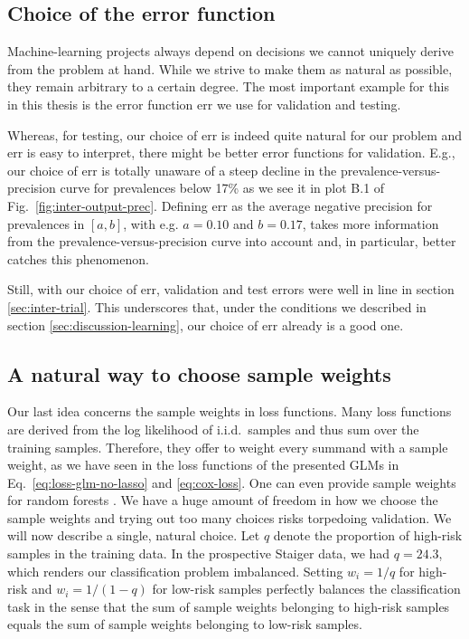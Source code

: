\subsection{Choice of the error function}

Machine-learning projects always depend on decisions we cannot uniquely derive from the problem at hand. 
While we strive to make them as natural as possible, they remain arbitrary to a certain degree. 
The most important example for this in this thesis is the error function $\text{err}$ we use for 
validation and testing.

Whereas, for testing, our choice of $\text{err}$ is indeed quite natural for our problem and 
$\text{err}$ is easy to interpret, there might be better error functions for validation. E.g., our 
choice of $\text{err}$ is totally unaware of a steep decline in the prevalence-versus-precision 
curve for prevalences below \num{17}\% as we see it in plot B.1 of Fig.\ \ref{fig:inter-output-prec}. 
Defining $\text{err}$ as the average negative precision for prevalences in $[a, b]$, with e.g. 
$a = \num{0.10}$ and $b = \num{0.17}$, takes more information from the prevalence-versus-precision 
curve into account and, in particular, better catches this phenomenon.

Still, with our choice of $\text{err}$, validation and test errors were well in line in 
section \ref{sec:inter-trial}. This underscores that, under the conditions we described in 
section \ref{sec:discussion-learning}, our choice of $\text{err}$ already is a good one.

\subsection{A natural way to choose sample weights}

Our last idea concerns the sample weights in loss functions. Many loss functions are derived 
from the log likelihood of i.i.d.\ samples and thus sum over the training samples. Therefore, they 
offer to weight every summand with a sample weight, as we have seen in the loss functions of the 
presented GLMs in Eq.\ \eqref{eq:loss-glm-no-lasso} and \eqref{eq:cox-loss}. One can even provide 
sample weights for random forests \cite{ranger17}. We have a huge amount of 
freedom in how we choose the sample weights and trying out too many choices risks torpedoing 
validation. We will now describe a single, natural choice. Let $q$ denote the 
proportion of high-risk samples in the training data. In the prospective Staiger data, we had 
$q = \num{24.3}$, which renders our classification problem imbalanced. Setting $w_i = 1/q$ for 
high-risk and $w_i = 1/(1-q)$ for low-risk samples perfectly balances the classification task in 
the sense that the sum of sample weights belonging to high-risk samples equals the sum of sample 
weights belonging to low-risk samples.